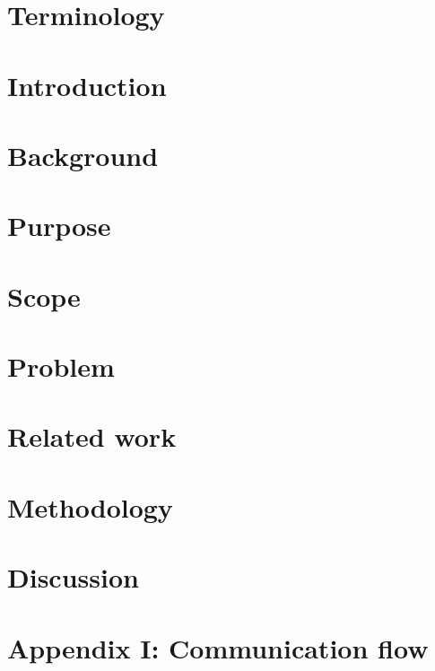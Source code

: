 \documentclass[Report.tex]{subfiles}
\begin{document}
\chapter{Terminology}
  

\chapter{Introduction}
  

\chapter{Background}
  

\chapter{Purpose}
  

\chapter{Scope}
  

\chapter{Problem}
  

\chapter{Related work}
  

\chapter{Methodology}
  

\chapter{Discussion}
  

\nocite{*} %
 
\printbibliography%

\chapter*{Appendix I: Communication flow}

\end{document}
